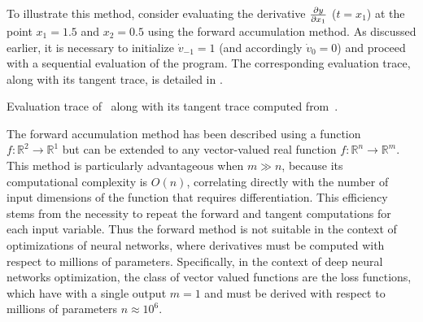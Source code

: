 To illustrate this method, consider evaluating the derivative $\frac{\partial y}{\partial x_1}$
($t=x_1$) at the point $x_1 = 1.5$ and $x_2 = 0.5$ using the forward
accumulation method. As discussed earlier, it is necessary to initialize
$\dot{v}_{-1} = 1$ (and accordingly $\dot{v}_0 = 0$) and proceed with a
sequential evaluation of the program. The corresponding evaluation trace, along with its
tangent trace, is detailed in .
\begin{margintable}
    \caption[Tangent Trace]{Evaluation trace of~ along with its
    tangent trace computed from~.}
    \centering
\end{margintable}
The forward accumulation method has been described using a function $f:
\mathbb{R}^2 \to \mathbb{R}^1$ but can be extended to any vector-valued real
function $f: \mathbb{R}^n \to \mathbb{R}^m$. This method is particularly
advantageous when $m \gg n$, because its computational complexity is $O(n)$,
correlating directly with the number of input dimensions of the function that
requires differentiation. This efficiency stems from the necessity to repeat
the forward and tangent computations for each input variable. Thus the forward
method is not suitable in the context of optimizations of neural networks,
where derivatives must be computed with respect to millions of parameters.
Specifically, in the context of deep neural networks optimization, the class
of vector valued functions are the loss functions, which have with a single
output $m=1$ and must be derived with respect to millions of parameters $n
\approx 10^6$.

